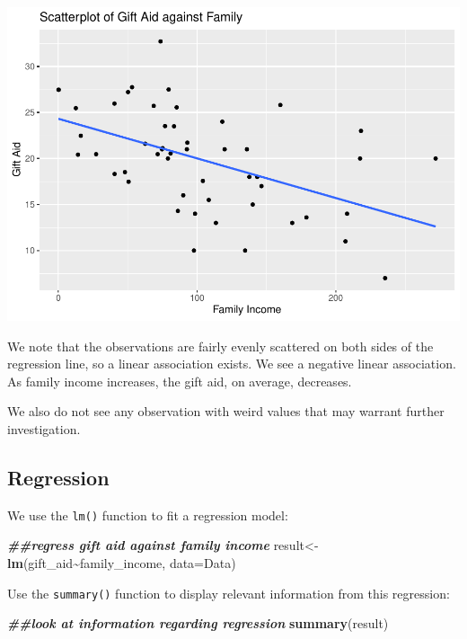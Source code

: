 \documentclass[
]{book}
\newenvironment{Shaded}{\begin{snugshade}}{\end{snugshade}}
\newcommand{\AttributeTok}[1]{\textcolor[rgb]{0.13,0.29,0.53}{#1}}
\newcommand{\DocumentationTok}[1]{\textcolor[rgb]{0.56,0.35,0.01}{\textbf{\textit{#1}}}}
\newcommand{\FunctionTok}[1]{\textcolor[rgb]{0.13,0.29,0.53}{\textbf{#1}}}
\newcommand{\NormalTok}[1]{#1}
\newcommand{\OtherTok}[1]{\textcolor[rgb]{0.56,0.35,0.01}{#1}}
\newcommand{\SpecialCharTok}[1]{\textcolor[rgb]{0.81,0.36,0.00}{\textbf{#1}}}
\begin{document}
\includegraphics{bookdown-demo_files/figure-latex/unnamed-chunk-14-1.pdf}

We note that the observations are fairly evenly scattered on both sides of the regression line, so a linear association exists. We see a negative linear association. As family income increases, the gift aid, on average, decreases.

We also do not see any observation with weird values that may warrant further investigation.

\hypertarget{regression}{%
\subsection*{Regression}\label{regression}}

We use the \texttt{lm()} function to fit a regression model:

\begin{Shaded}
\begin{Highlighting}[]
\DocumentationTok{\#\#regress gift aid against family income}
\NormalTok{result}\OtherTok{\textless{}{-}}\FunctionTok{lm}\NormalTok{(gift\_aid}\SpecialCharTok{\textasciitilde{}}\NormalTok{family\_income, }\AttributeTok{data=}\NormalTok{Data)}
\end{Highlighting}
\end{Shaded}

Use the \texttt{summary()} function to display relevant information from this regression:

\begin{Shaded}
\begin{Highlighting}[]
\DocumentationTok{\#\#look at information regarding regression}
\FunctionTok{summary}\NormalTok{(result)}
\end{Highlighting}
\end{Shaded}
\end{document}
